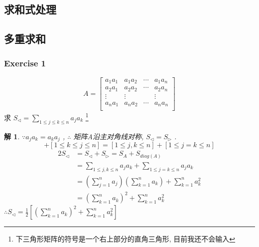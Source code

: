 \documentclass[mode=geye]{elegantnote}
\newtheorem{solve}{解}
\begin{document}
\subsection{求和式处理}
\subsection{多重求和}

\subsubsection{Exercise 1}
\begin{equation}
    A = \begin{bmatrix}
        a_1 a_1 & a_1 a_2 & \cdots & a_1 a_n \\
        a_2 a_1 & a_2 a_2 & \cdots & a_2 a_n \\
        \vdots  & \vdots  &        & \vdots  \\
        a_n a_1 & a_n a_2 & \cdots & a_n a_n \\
    \end{bmatrix}
\end{equation}
求 $ S_{\triangleleft} = \sum_{1\leqslant j \leqslant k \leqslant n} a_j a_k $ \footnote{下三角形矩阵的符号是一个右上部分的直角三角形, 目前我还不会输入}

\begin{solve}
    $ \because a_j a_k = a_k a_j $ , $ \therefore  $ 矩阵A沿主对角线对称, $ S_{\triangleleft} = S_{\triangleright} $ .
    \begin{equation*}
        [1\leqslant j \leqslant k \leqslant n] + [1\leqslant k \leqslant j \leqslant n] =[1\leqslant j , k \leqslant n] + [1\leqslant j = k \leqslant n]
    \end{equation*}
    \begin{align*}
        2S_{\triangleleft} &= S_{\triangleleft}+S_{\triangleright} = S_{A}+S_{diag(A)} \\
        &= \sum_{1\leqslant j , k \leqslant n} a_j a_k + \sum_{1\leqslant j = k \leqslant n} a_j a_k\\
        &= \left(\sum_{j=1}^{n} a_j\right)\left(\sum_{k=1}^{n} a_k\right) + \sum_{k=1}^{n} a_k^2\\
        &= \left(\sum_{k=1}^{n} a_k\right)^2 + \sum_{k=1}^{n} a_k^2
    \end{align*}
    $ \therefore S_{\triangleleft} = \frac{1}{2}[\left(\sum_{k=1}^{n} a_k\right)^2 + \sum_{k=1}^{n} a_k^2] $ 
\end{solve}
\end{document}
